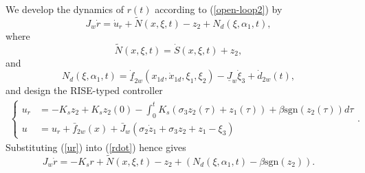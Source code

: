 \documentclass{article}
\newcommand{\sgn}{\text{sgn}}
\begin{document}
	We develop the dynamics of $r(t)$ according to (\ref{open-loop2}) by
	\begin{equation}
	J_{w}\dot{r} = \dot{u}_{r} + \tilde{N}\left(x,\xi,t\right) -z_{2} + N_{d}\left(\xi,\alpha_{1},t\right), \label{rdot}
	\end{equation}
	where 
	\begin{equation}
	\tilde{N}\left(x,\xi,t\right) = \dot{S}\left(x,\xi,t\right) + z_{2}, \label{N_tilde}
	\end{equation}
	and 
	\begin{equation}
	N_{d}\left(\xi,\alpha_{1},t\right) = \dot{\underline{f}}_{2w}\left(x_{1d},\dot{x}_{1d},\xi_{1},\xi_{2}\right) - \underline{J}_{w}\dot{\xi}_{3} + \dot{d}_{2w}(t), \label{Nd}
	\end{equation}
	and design the RISE-typed controller
	\begin{align}
	\begin{cases}
	u_{r} &= -K_{s}z_{2} + K_{s}z_{2}(0) - \int_{0}^{t}K_{s}\left(\sigma_{3}z_{2}\left(\tau\right) + z_{1}\left(\tau\right)\right) + \beta\sgn\left(z_{2}\left(\tau\right)\right) d\tau \\
	u &= u_{r} + \bar{f}_{2w}(x) + \bar{J}_{w}\left(\sigma_{2}\dot{z}_{1}+\sigma_{3}z_{2}+z_{1}-\xi_{3}\right)
	\end{cases}.  \label{ur}
	\end{align}
	Substituting (\ref{ur}) into (\ref{rdot}) hence gives
	\begin{equation}
	J_{w}\dot{r} = -K_{s}r + \tilde{N}\left(x,\xi,t\right) -z_{2} + \left(N_{d}\left(\xi,\alpha_{1},t\right)-\beta\sgn\left(z_{2}\right)\right). \label{rdot2}
	\end{equation}
	
\end{document}
